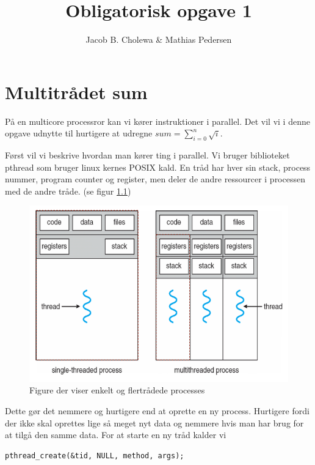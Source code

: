 \documentclass[danish]{report}
\title{Obligatorisk opgave 1}
\author{Jacob B. Cholewa \& Mathias Pedersen }
\begin{document}
\maketitle
\chapter{Multitrådet sum}
På en multicore processror kan vi kører instruktioner i parallel. Det vil vi i denne opgave udnytte til hurtigere at udregne $ sum = \displaystyle\sum\limits_{i=0}^n \sqrt{i} $.

Først vil vi beskrive hvordan man kører ting i parallel. Vi bruger biblioteket pthread som bruger linux kernes POSIX kald. En tråd har hver sin stack, process nummer, program counter og register, men deler de andre ressourcer i processen med de andre tråde. (se figur \ref{fig:1})


\begin{figure}[H]
\begin{center}
\includegraphics[scale=0.4]{img/1.png}
\caption{Figure der viser enkelt og flertrådede processes}
\label{fig:1}
\end{center}
\end{figure}


Dette gør det nemmere og hurtigere end at oprette en ny process. Hurtigere fordi der ikke skal oprettes lige så meget nyt data og nemmere hvis man har brug for at tilgå den samme data. For at starte en ny tråd kalder vi



\begin{lstlisting}
pthread_create(&tid, NULL, method, args);
\end{lstlisting}
\end{document}

